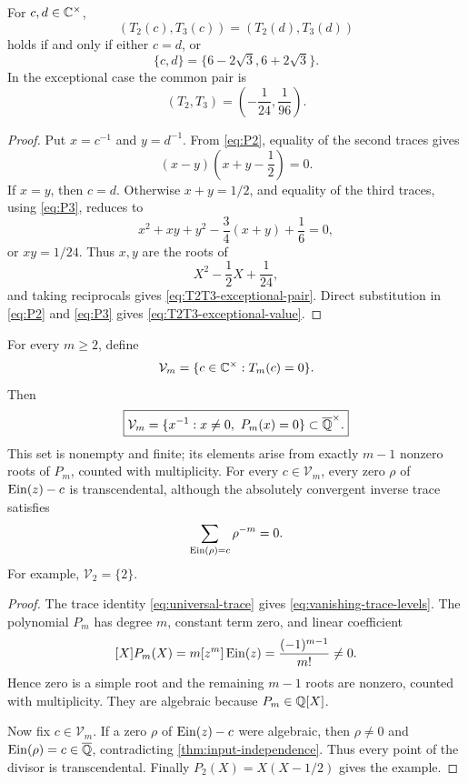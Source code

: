 \begin{theorem}
\label{thm:T2T3-collision}
For \(c,d\in\mathbb C^\times\),
\[
 (T_2(c),T_3(c))=(T_2(d),T_3(d))
\]
holds if and only if either \(c=d\), or
\begin{equation}\label{eq:T2T3-exceptional-pair}
 \boxed{\{c,d\}=\{6-2\sqrt3,6+2\sqrt3\}.}
\end{equation}
In the exceptional case the common pair is
\begin{equation}\label{eq:T2T3-exceptional-value}
 \boxed{(T_2,T_3)=\left(-\frac1{24},\frac1{96}\right).}
\end{equation}
\end{theorem}

\begin{proof}
Put \(x=c^{-1}\) and \(y=d^{-1}\).  From \eqref{eq:P2}, equality of the
second traces gives
\[
 (x-y)\left(x+y-\frac12\right)=0.
\]
If \(x=y\), then \(c=d\).  Otherwise \(x+y=1/2\), and equality of the
third traces, using \eqref{eq:P3}, reduces to
\[
 x^2+xy+y^2-\frac34(x+y)+\frac16=0,
\]
or \(xy=1/24\).  Thus \(x,y\) are the roots of
\[
 X^2-\frac12X+\frac1{24},
\]
and taking reciprocals gives \eqref{eq:T2T3-exceptional-pair}.  Direct
substitution in \eqref{eq:P2} and \eqref{eq:P3} gives
\eqref{eq:T2T3-exceptional-value}.
\end{proof}

\begin{corollary}
\label{cor:vanishing-trace-levels}
For every \(m\ge2\), define
\[
 \mathcal V_m=
 \{c\in\mathbb C^\times:T_m(c)=0\}.
\]
Then
\begin{equation}\label{eq:vanishing-trace-levels}
 \boxed{\mathcal V_m=
 \{x^{-1}:x\ne0,\ P_m(x)=0\}\subset\overline{\mathbb Q}^\times.}
\end{equation}
This set is nonempty and finite; its elements arise from exactly \(m-1\)
nonzero roots of \(P_m\), counted with multiplicity.  For every
\(c\in\mathcal V_m\), every zero \(\rho\) of \(\operatorname{Ein}(z)-c\) is
transcendental, although the absolutely convergent inverse trace satisfies
\[
 \sum_{\operatorname{Ein}(\rho)=c}\rho^{-m}=0.
\]
For example, \(\mathcal V_2=\{2\}\).
\end{corollary}

\begin{proof}
The trace identity \eqref{eq:universal-trace} gives
\eqref{eq:vanishing-trace-levels}.  The polynomial \(P_m\) has degree
\(m\), constant term zero, and linear coefficient
\[
 [X]P_m(X)=m[z^m]\operatorname{Ein}(z)=\frac{(-1)^{m-1}}{m!}\ne0.
\]
Hence zero is a simple root and the remaining \(m-1\) roots are nonzero,
counted with multiplicity.  They are algebraic because \(P_m\in\mathbb Q[X]\).

Now fix \(c\in\mathcal V_m\).  If a zero \(\rho\) of \(\operatorname{Ein}(z)-c\) were
algebraic, then \(\rho\ne0\) and
\(\operatorname{Ein}(\rho)=c\in\overline{\mathbb Q}\), contradicting
\cref{thm:input-independence}.  Thus every point of the divisor is
transcendental.  Finally \(P_2(X)=X(X-1/2)\) gives the example.
\end{proof}

